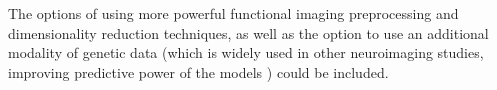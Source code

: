 The options of using more powerful functional imaging preprocessing and dimensionality reduction techniques, as well as the option to use an additional modality of genetic data (which is widely used in other neuroimaging studies, improving predictive power of the models \cite{cole2018brain,parisot2018disease}) could be included.


